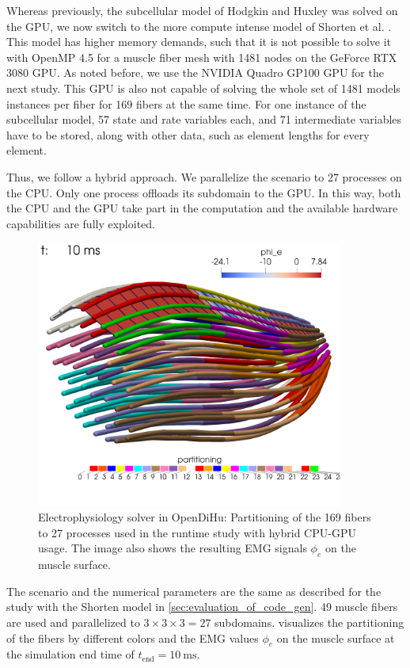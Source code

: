 Whereas previously, the subcellular model of Hodgkin and Huxley was solved on the GPU, we now switch to the more compute intense model of Shorten et al. \cite{Shorten2007}. This model has higher memory demands, such that it is not possible to solve it with OpenMP 4.5 for a muscle fiber mesh with 1481 nodes on the GeForce RTX 3080 GPU. As noted before, we use the NVIDIA Quadro GP100 GPU for the next study.
This GPU is also not capable of solving the whole set of 1481 models instances per fiber for 169 fibers at the same time. For one instance of the subcellular model, 57 state and rate variables each, and 71 intermediate variables have to be stored, along with other data, such as element lengths for every element.

Thus, we follow a hybrid approach. We parallelize the scenario to 27 processes on the CPU. Only one process offloads its subdomain to the GPU. In this way, both the CPU and the GPU take part in the computation and the available hardware capabilities are fully exploited.

\begin{figure}
  \centering%
  \includegraphics[width=0.9\textwidth]{images/results/studies/gpu_parallelization.png}%
  \caption{Electrophysiology solver in OpenDiHu: Partitioning of the 169 fibers to 27 processes used in the runtime study with hybrid CPU-GPU usage. The image also shows the resulting EMG signals $\phi_e$ on the muscle surface.}%
  \label{fig:gpu_parallelization}%
\end{figure}

The scenario and the numerical parameters are the same as described for the study with the Shorten model in \cref{sec:evaluation_of_code_gen}. 49 muscle fibers are used and parallelized to $3\times 3\times 3=27$ subdomains.  visualizes the partitioning of the fibers by different colors and the EMG values $\phi_e$ on the muscle surface at the simulation end time of $t_\text{end}=\SI{10}{\ms}$.

